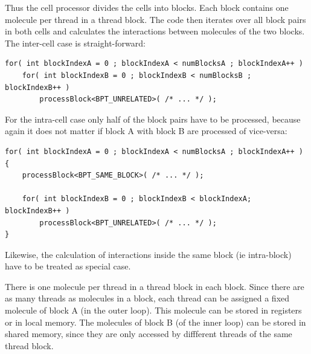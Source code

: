Thus the cell processor divides the cells into blocks. Each block contains one molecule per thread in a thread block.
The code then iterates over all block pairs in both cells and calculates the interactions between molecules of the two blocks.
The inter-cell case is straight-forward:
\begin{lstlisting}[label=intercellloop,caption=Inter-Cell Block Processing]
for( int blockIndexA = 0 ; blockIndexA < numBlocksA ; blockIndexA++ )
	for( int blockIndexB = 0 ; blockIndexB < numBlocksB ; blockIndexB++ )
		processBlock<BPT_UNRELATED>( /* ... */ );

\end{lstlisting}
For the intra-cell case only half of the block pairs have to be processed, because again it does not matter if block A with block B are processed of vice-versa:
\begin{lstlisting}[label=intracellloop,caption=Intra-Cell Block Processing]
for( int blockIndexA = 0 ; blockIndexA < numBlocksA ; blockIndexA++ ) {
	processBlock<BPT_SAME_BLOCK>( /* ... */ );
	
	for( int blockIndexB = 0 ; blockIndexB < blockIndexA; blockIndexB++ )
		processBlock<BPT_UNRELATED>( /* ... */ );
}
\end{lstlisting}
Likewise, the calculation of interactions inside the same block (ie intra-block) have to be treated as special case.

There is one molecule per thread in a thread block in each block. Since there are as many threads as molecules in a block, each thread can be assigned a fixed molecule of block A (in the outer loop). This molecule can be stored in registers or in local memory.
The molecules of block B (of the inner loop) can be stored in shared memory, since they are only accessed by diffferent threads of the same thread block.

